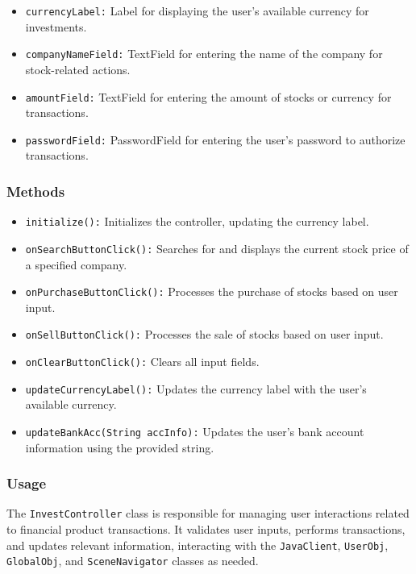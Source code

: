 \documentclass{article}
\begin{document}
\begin{itemize}
    \item \texttt{currencyLabel:} Label for displaying the user's available currency for investments.
    \item \texttt{companyNameField:} TextField for entering the name of the company for stock-related actions.
    \item \texttt{amountField:} TextField for entering the amount of stocks or currency for transactions.
    \item \texttt{passwordField:} PasswordField for entering the user's password to authorize transactions.
\end{itemize}

\subsubsection*{Methods}

\begin{itemize}
    \item \texttt{initialize():} Initializes the controller, updating the currency label.
    \item \texttt{onSearchButtonClick():} Searches for and displays the current stock price of a specified company.
    \item \texttt{onPurchaseButtonClick():} Processes the purchase of stocks based on user input.
    \item \texttt{onSellButtonClick():} Processes the sale of stocks based on user input.
    \item \texttt{onClearButtonClick():} Clears all input fields.
    \item \texttt{updateCurrencyLabel():} Updates the currency label with the user's available currency.
    \item \texttt{updateBankAcc(String accInfo):} Updates the user's bank account information using the provided string.
\end{itemize}

\subsubsection*{Usage}

The \texttt{InvestController} class is responsible for managing user interactions related to financial product transactions. It validates user inputs, performs transactions, and updates relevant information, interacting with the \texttt{JavaClient}, \texttt{UserObj}, \texttt{GlobalObj}, and \texttt{SceneNavigator} classes as needed.
\end{document}

